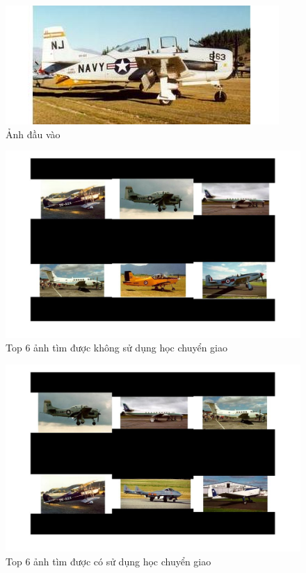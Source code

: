 \documentclass[a4paper,14pt]{extreport}
\begin{document}
\begin{figure}
    \centering
    \includegraphics[scale=1]{img/ariplane-query.jpg}
    \caption{Ảnh đầu vào}
\end{figure}

\begin{figure}
    \centering
    \includegraphics[scale=0.4]{img/airplane_query_by_similarity_no_transfer.jpg}
    \caption{Top 6 ảnh tìm được không sử dụng học chuyển giao}
\end{figure}

\begin{figure}
    \centering
    \includegraphics[scale=0.4]{img/airplane_query_by_similarity.jpg}
    \caption{Top 6 ảnh tìm được có sử dụng học chuyển giao}
\end{figure}
\end{document}
